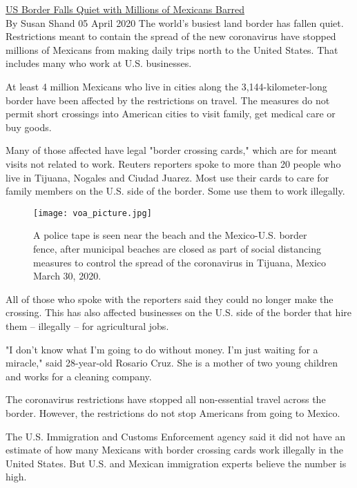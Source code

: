 \href{https://www.51voa.com/VOA_Special_English/us-border-falls-quiet-with-millions-of-mexicans-barred-84264.html}{US Border Falls Quiet with Millions of Mexicans Barred} \\

By Susan Shand
05 April 2020
The world's busiest land border has fallen quiet. Restrictions meant to contain the spread of the new coronavirus have stopped millions of Mexicans from making daily trips north to the United States. That includes many who work at U.S. businesses.

At least 4 million Mexicans who live in cities along the 3,144-kilometer-long border have been affected by the restrictions on travel. The measures do not permit short crossings into American cities to visit family, get medical care or buy goods.

Many of those affected have legal "border crossing cards," which are for meant visits not related to work. Reuters reporters spoke to more than 20 people who live in Tijuana, Nogales and Ciudad Juarez. Most use their cards to care for family members on the U.S. side of the border. Some use them to work illegally.

\begin{figure}[h] %
    \texttt{[image: voa\_picture.jpg]}
    \caption{A police tape is seen near the beach and the Mexico-U.S. border fence, after municipal beaches are closed as part of social distancing measures to control the spread of the coronavirus in Tijuana, Mexico March 30, 2020.}
\end{figure}

All of those who spoke with the reporters said they could no longer make the crossing. This has also affected businesses on the U.S. side of the border that hire them – illegally – for agricultural jobs.

"I don't know what I'm going to do without money. I'm just waiting for a miracle," said 28-year-old Rosario Cruz. She is a mother of two young children and works for a cleaning company.

The coronavirus restrictions have stopped all non-essential travel across the border. However, the restrictions do not stop Americans from going to Mexico.

The U.S. Immigration and Customs Enforcement agency said it did not have an estimate of how many Mexicans with border crossing cards work illegally in the United States. But U.S. and Mexican immigration experts believe the number is high.

